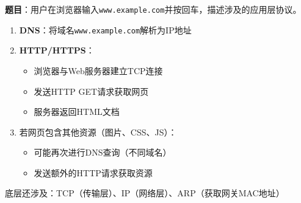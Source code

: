 \begin{examplebox}[例题6.8 应用层协议综合]
\textbf{题目}：用户在浏览器输入\texttt{www.example.com}并按回车，描述涉及的应用层协议。
\tcblower
\begin{enumerate}[itemsep=0pt]
    \item \textbf{DNS}：将域名\texttt{www.example.com}解析为IP地址
    
    \item \textbf{HTTP/HTTPS}：
    \begin{itemize}[itemsep=0pt]
        \item 浏览器与Web服务器建立TCP连接
        \item 发送HTTP GET请求获取网页
        \item 服务器返回HTML文档
    \end{itemize}
    
    \item 若网页包含其他资源（图片、CSS、JS）：
    \begin{itemize}[itemsep=0pt]
        \item 可能再次进行DNS查询（不同域名）
        \item 发送额外的HTTP请求获取资源
    \end{itemize}
\end{enumerate}

底层还涉及：TCP（传输层）、IP（网络层）、ARP（获取网关MAC地址）
\end{examplebox}
